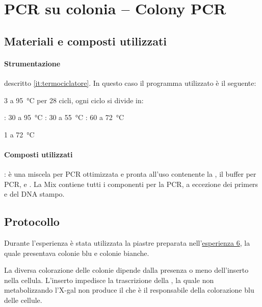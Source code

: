 \section{PCR su colonia -- \foreignlanguage{english}{Colony PCR}}

\subsection{Materiali e composti utilizzati}
\paragraph{Strumentazione}
\begin{itemize}
	\itemb[Termociclatore:] descritto \autoref{it:termociclatore}. In questo caso il programma utilizzato è il seguente:
	\begin{itemize}[squareItem]
		 \qty{3}{\min} a \qty{95}{\celsius}
		\itemb[Amplificazione] per 28 cicli, ogni ciclo si divide in:
		\begin{itemize}[squareItem]
			\itemb[Denaturazione]: \qty{30}{\sec} a \qty{95}{\celsius}
			\itemb[Ibridazione]: \qty{30}{\sec} a \qty{55}{\celsius}
			\itemb[Estensione]: \qty{60}{\sec} a \qty{72}{\celsius}
		\end{itemize}
		 \qty{1}{\min} a \qty{72}{\celsius}
	\end{itemize}
\end{itemize}

\paragraph{Composti utilizzati}
\begin{itemize}
	: è una miscela per PCR ottimizzata e pronta all'uso contenente la , il buffer per PCR,  e .
	La Mix contiene tutti i componenti per la PCR, a eccezione dei primers e del DNA stampo.
\end{itemize}


\subsection{Protocollo}
\begin{Note}
	Durante l'esperienza è stata utilizzata la piastre preparata nell'\hyperref[sec:6]{esperienza 6}, la quale presentava colonie blu e colonie bianche.

	\vspace*{.2cm}
	La diversa colorazione delle colonie dipende dalla presenza o meno dell'inserto nella cellula. L'inserto impedisce la trascrizione della , la quale non metabolizzando l’\gls{X-gal} non produce il  che è il responsabile della colorazione blu delle cellule.
\end{Note}

